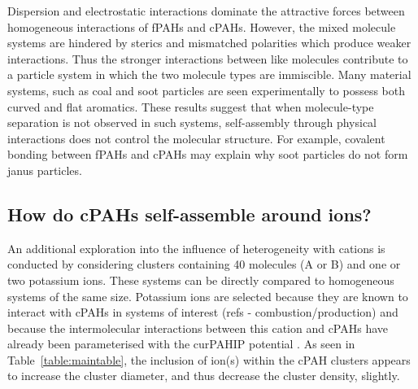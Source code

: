 Dispersion and electrostatic interactions dominate the attractive forces between homogeneous interactions of fPAHs and cPAHs. However, the mixed molecule systems are hindered by sterics and mismatched polarities which produce weaker interactions. Thus the stronger interactions between like molecules contribute to a particle system in which the two molecule types are immiscible. Many material systems, such as coal and soot particles are seen experimentally to possess both curved and flat aromatics. These results suggest that when molecule-type separation is not observed in such systems, self-assembly through physical interactions does not control the molecular structure. For example, covalent bonding between fPAHs and cPAHs may explain why soot particles do not form janus particles.




\subsection{How do cPAHs self-assemble around ions?} %
An additional exploration into the influence of heterogeneity with cations is conducted by considering clusters containing 40 molecules (A or B) and one or two potassium ions.  These systems can be directly compared to homogeneous systems of the same size. Potassium ions are selected because they are known to interact with cPAHs in systems of interest (refs - combustion/production) and because the intermolecular interactions between this cation and cPAHs have already been parameterised with the curPAHIP potential \cite{bowal2019ion}. As seen in Table~\ref{table:maintable},
the inclusion of ion(s) within the cPAH clusters appears to increase the cluster diameter, and thus decrease the cluster density, slightly.

